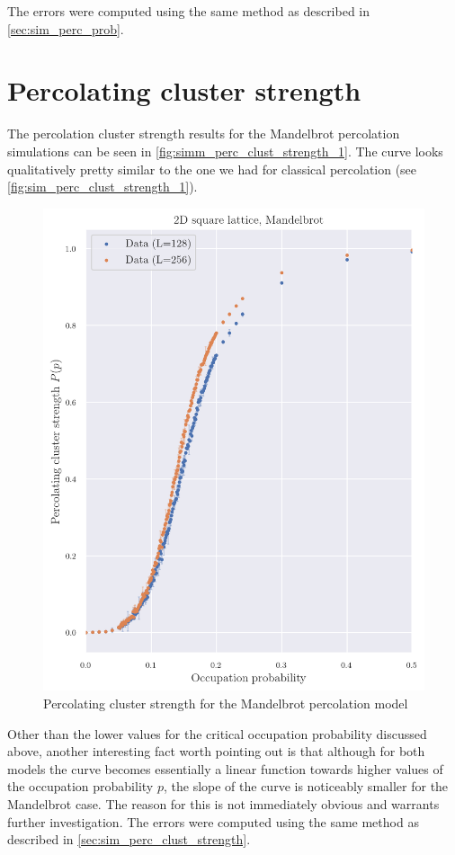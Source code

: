 The errors were computed using the same method as described in \autoref{sec:sim_perc_prob}.

\section{Percolating cluster strength}

The percolation cluster strength results for the Mandelbrot percolation simulations can be seen in \autoref{fig:simm_perc_clust_strength_1}. The curve looks qualitatively pretty similar to the one we had for classical percolation (see \autoref{fig:sim_perc_clust_strength_1}).


\begin{figure}[H]
  \includegraphics[width=\linewidth]{Images/simm_perc_clust_strength_1.png}
  \caption{Percolating cluster strength for the Mandelbrot percolation model}
  \label{fig:simm_perc_clust_strength_1}
\end{figure}

Other than the lower values for the critical occupation probability discussed above, another interesting fact worth pointing out is that although for both models the curve becomes essentially a linear function towards higher values of the occupation probability $p$, the slope of the curve is noticeably smaller for the Mandelbrot case. The reason for this is not immediately obvious and warrants further investigation.
The errors were computed using the same method as described in \autoref{sec:sim_perc_clust_strength}.


